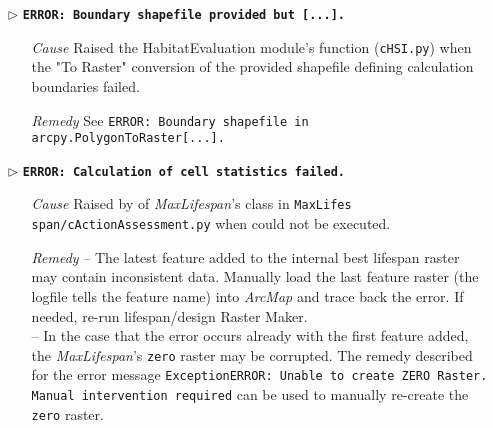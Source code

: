 \begin{itemize}
	\item[$\triangleright$]\textbf{\texttt{ERROR: Boundary shapefile provided but [...].}}
	\begin{itemize}
		\item[\textit{Cause}\hspace{0.27cm}] Raised the HabitatEvaluation module's  function (\texttt{cHSI.py}) when the "To Raster" conversion of the provided shapefile defining calculation boundaries failed.
		\item[\textit{Remedy}] See \texttt{ERROR: Boundary shapefile in arcpy.PolygonToRaster[...].}\\
	\end{itemize}
	
	\item[$\triangleright$]\textbf{\texttt{ERROR: Calculation of cell statistics failed.}}
	\begin{itemize}
		\item[\textit{Cause}\hspace{0.27cm}] Raised by  of \textit{MaxLifespan}'s  class in \texttt{MaxLifes span/cActionAssessment.py} when  could not be executed.
		\item[\textit{Remedy}] -- The latest feature added to the internal best lifespan raster may contain inconsistent data. Manually load the last feature raster (the logfile tells the feature name) into \textit{ArcMap} and trace back the error. If needed, re-run lifespan/design Raster Maker.\\
							-- In the case that the error occurs already with the first feature added, the \textit{MaxLifespan}'s \texttt{zero} raster may be corrupted. The remedy described for the error message \texttt{ExceptionERROR: Unable to create ZERO Raster. Manual intervention required} can be used to manually re-create the \texttt{zero} raster.\\
	\end{itemize}
	

\end{itemize}
